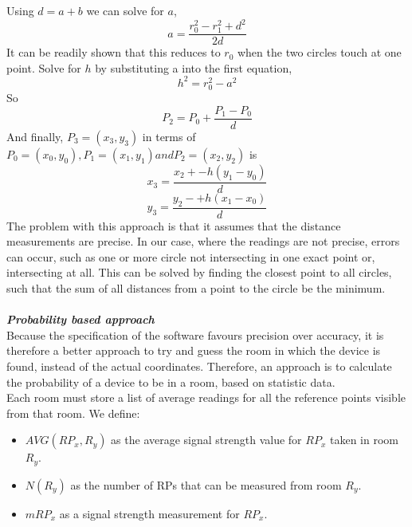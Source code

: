 Using $d = a + b$ we can solve for $a$,
$$a = \frac{r_0^2 - r_1^2 +d^2}{2d}$$
It can be readily shown that this reduces to $r_0$ when the two circles touch at one point.
Solve for $h$ by substituting a into the first equation, $$h^2 = r_0^2 - a^2$$
So $$P_2 = P_0 + \frac{P_1 - P_0}{d}$$
And finally, $P_3 = (x_3, y_3)$ in terms of $P_0 = (x_0, y_0),  P_1 = (x_1, y_1) and P_2 = (x_2, y_2)$ is $$x_3 =\frac{x_2 + -h(y_1 - y_0)}{d}$$ $$y_3 =\frac{y_2 - +h(x_1 - x_0)}{d}$$
The problem with this approach is that it assumes that the distance measurements are precise. In our case, where the readings are not precise, errors can occur, such as one or more circle not intersecting in one exact point or, intersecting at all.
This can be solved by finding the closest point to all circles, such that the sum of all distances from a point to the circle be the minimum.\\
\\
\textit{\textbf{Probability based approach}}
\\
Because the specification of the software favours precision over accuracy, it is therefore a better approach to try and guess the room in which the device is found, instead of the actual coordinates. Therefore, an approach is to calculate the probability of a device to be in a room, based on statistic data.\\
Each room must store a list of average readings for all the reference points visible from that room. 
We define:\\
\begin{itemize}
\item $AVG(RP_x, R_y)$ as the average signal strength value for $RP_x$ taken in room $R_y$.
\item $N(R_y)$ as the number of RPs that can be measured from room $R_y$.
\item $mRP_x$ as a signal strength measurement for $RP_x$.
\end{itemize} 

